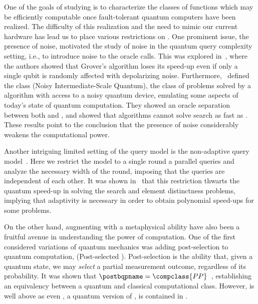 One of the goals of studying \bqpname is to characterize the classes of functions which may be efficiently computable once fault-tolerant quantum computers have been realized. The difficulty of this realization and the need to mimic our current hardware has lead us to place various restrictions on \bqpname . One prominent issue, the presence of noise, motivated the study of noise in the quantum query complexity setting, i.e., to introduce noise to the oracle calls. This was explored in~\cite{ addendum_noisy_oracle_search}, where the authors showed that Grover's algorithm loses its speed-up even if only a single qubit is randomly affected with depolarizing noise. Furthermore,~\cite{nisq_computation} defined the class  (Noisy Intermediate-Scale Quantum), the class of problems solved by a  algorithm with access to a noisy quantum device, emulating some aspects of today's state of quantum computation. They showed an oracle separation between both  and \bqpname, and showed that  algorithms cannot solve search as fast as \bqpname. 
These results point to the conclusion that the presence of noise considerably weakens the computational power. 


Another intriguing limited setting of the query model is the non-adaptive query model~\cite{nonadaptive_weighted_adversary}. Here we restrict the model to a single round a parallel queries and analyze the necessary width of the round, imposing that the queries are independent of each other. It was shown in~\cite{nonadaptive_weighted_adversary} that this restriction thwarts the quantum speed-up in solving the search and element distinctness problems, implying that adaptivity is necessary in order to obtain polynomial speed-ups for some problems.

 
 On the other hand, augmenting \bqpname with a metaphysical ability have also been a fruitful avenue in understanding the power of computation. 
 One of the first considered variations of quantum mechanics was adding post-selection to quantum computation, \postbqpname (Post-selected \bqpname). Post-selection is the ability that, given a quantum state, we may \emph{select} a partial measurement outcome, regardless of its probability. It was shown that $\postbqpname=\compclass{PP}$~\cite{pp_postbqp}, establishing an equivalency between a quantum and classical computational class. However, \postbqpname is well above \bqpname as even , a quantum version of , is contained in .

